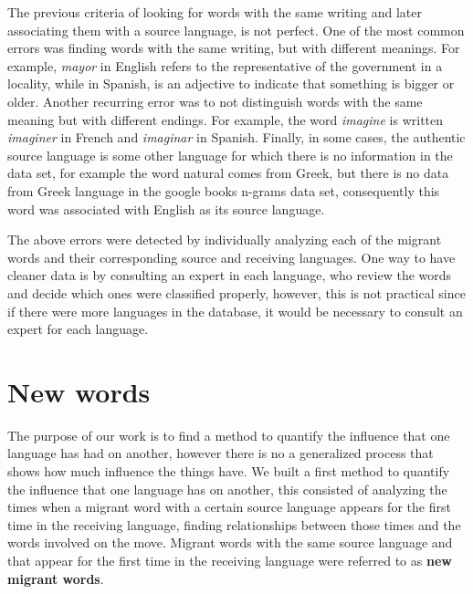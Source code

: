 \documentclass[10pt,letterpaper]{article} %
\begin{document}
The previous criteria of looking for words with the same writing and later
associating them with a source language, is not perfect. One of the most common
errors was finding words with the same writing, but with different meanings.
For example,  \textit{mayor} in English refers to the representative of the government in
a locality, while in Spanish,  is an adjective to indicate that something
is bigger or older.  Another recurring error was to not distinguish words with
the same meaning but with different endings. For example, the word \textit{imagine} is
written \textit{imaginer} in French and \textit{imaginar} in Spanish.  Finally, in some cases, the
authentic source language is some other language for which there is no
information in the data set, for example the word  natural comes from Greek,
but there is no data from Greek language in the google books n-grams data set,
consequently this word was associated with English as its source language.

The above errors were detected by individually analyzing each of the migrant
words and their corresponding source and receiving languages. One way to have
cleaner data is by consulting an expert in each language, who review the words
and decide which ones were classified properly, however, this is not practical
since if there were more languages  ​​in the database, it would be
necessary to consult an expert for each language.

\section*{New words} %
The purpose of our work is to find a method to quantify the influence that one language has had on another, however there is no a generalized process that shows how much influence the things have. We built a first method to quantify the influence that one language has on another, this consisted of analyzing the times when a migrant word with a certain source language appears for the first time in the receiving language, finding relationships between those times and the words involved on the move. Migrant words with the same source language and that appear for the first time in the receiving language were referred to as \textbf{new migrant words}.
\end{document}
